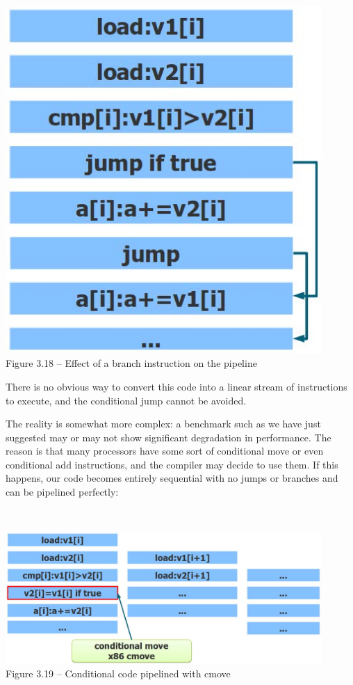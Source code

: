 \hspace*{\fill} \\ %
\begin{center}
\includegraphics[width=0.9\textwidth]{content/1/chapter3/images/18.jpg}\\
Figure 3.18 – Effect of a branch instruction on the pipeline
\end{center}

There is no obvious way to convert this code into a linear stream of instructions to execute, and the conditional jump cannot be avoided.

The reality is somewhat more complex: a benchmark such as we have just suggested may or may not show significant degradation in performance. The reason is that many processors have some sort of conditional move or even conditional add instructions, and the compiler may decide to use them. If this happens, our code becomes entirely sequential with no jumps or branches and can be pipelined perfectly:

\hspace*{\fill} \\ %
\begin{center}
\includegraphics[width=0.9\textwidth]{content/1/chapter3/images/19.jpg}\\
Figure 3.19 – Conditional code pipelined with cmove
\end{center}

